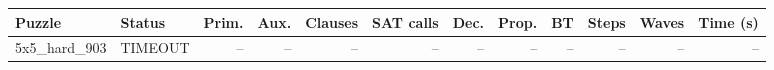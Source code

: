 \begin{tabular}{l l r r r r r r r r r r }
\hline
Puzzle & Status & Prim. & Aux. & Clauses & SAT calls & Dec. & Prop. & BT & Steps & Waves & Time (s) \\
\hline
5x5\_hard\_903 & TIMEOUT & -- & -- & -- & -- & -- & -- & -- & -- & -- & -- \\
\hline
\end{tabular}
